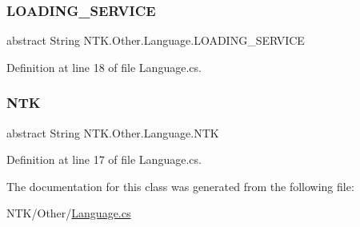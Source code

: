 \subsubsection{\texorpdfstring{LOADING\_SERVICE}{LOADING\_SERVICE}}
{\footnotesize\ttfamily abstract String N\+T\+K.\+Other.\+Language.\+L\+O\+A\+D\+I\+N\+G\+\_\+\+S\+E\+R\+V\+I\+CE\hspace{0.3cm}{\ttfamily [get]}}



Definition at line 18 of file Language.\+cs.

\mbox{\label{class_n_t_k_1_1_other_1_1_language_a33bdd269554bd5fb6229cd4917a8a8ac}} 
\subsubsection{\texorpdfstring{NTK}{NTK}}
{\footnotesize\ttfamily abstract String N\+T\+K.\+Other.\+Language.\+N\+TK\hspace{0.3cm}{\ttfamily [get]}}



Definition at line 17 of file Language.\+cs.



The documentation for this class was generated from the following file\+:\begin{DoxyCompactItemize}
\item 
N\+T\+K/\+Other/\mbox{\hyperlink{_language_8cs}{Language.\+cs}}\end{DoxyCompactItemize}

